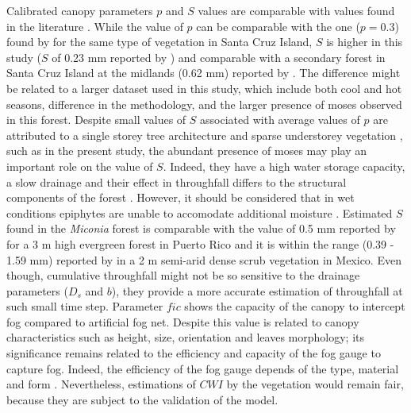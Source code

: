 \documentclass[a4paper,12pt]{article}
\begin{document}
\begin{linenumbers}
Calibrated canopy parameters $p$ and $S$ values are comparable with values found in the literature \citep{Aston1979, Lloydetal1988, WallaceandMcJannet2008, Takahashietal2011, Holwerdaetal2012}. While the value of $p$ can be comparable with the one ($p=0.3$) found by \cite{Pryetetal2012a} for the same type of vegetation in Santa Cruz Island, $S$ is higher in this study ($S$ of 0.23 mm reported by \cite{Pryetetal2012a}) and comparable with a secondary forest in Santa Cruz Island at the midlands (0.62 mm) reported by \cite{Dominguezetal2016}. The difference might be related to a larger dataset used in this study, which include both cool and hot seasons, difference in the methodology, and the larger presence of moses observed in this forest. Despite small values of $S$ associated with average values of $p$ are attributed to a single storey tree architecture and sparse understorey vegetation \citep{Pryetetal2012a}, such as in the present study, the abundant presence of moses may play an important role on the value of $S$. Indeed, they have a high water storage capacity, a slow drainage and their effect in throughfall differs to the structural components of the forest \citep{Richardsonetal2000, Kohleretal2007, Villegasetal2008}. However, it should be considered that in wet conditions epiphytes are unable to accomodate additional moisture \citep{Holscheretal2004}. Estimated $S$ found in the \textit{Miconia} forest is comparable with the value of 0.5 mm reported by \cite{Holwerdaetal2006} for a 3 m high evergreen forest in Puerto Rico and it is within the range (0.39 - 1.59 mm) reported by \cite{NavarndBryan1994} in a 2 m semi-arid dense scrub vegetation in Mexico. Even though, cumulative throughfall might not be so sensitive to the drainage parameters ($D_s$ and $b$), they provide a more accurate estimation of throughfall at such small time step. Parameter $fic$ shows the capacity of the canopy to intercept fog compared to artificial fog net. Despite this value is related to canopy characteristics such as height, size, orientation and leaves morphology; its significance remains related to the efficiency and capacity of the fog gauge to capture fog. Indeed, the efficiency of the fog gauge depends of the type, material and form \citep{Villegasetal2008}. Nevertheless, estimations of $CWI$ by the vegetation would remain fair, because they are subject to the validation of the model. 


\end{linenumbers}
\end{document}

